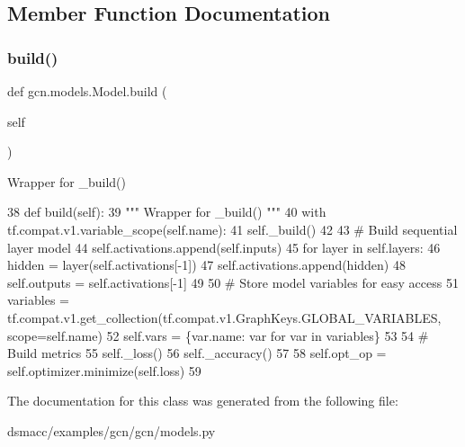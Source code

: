 \subsection{Member Function Documentation}
\mbox{\label{classgcn_1_1models_1_1Model_aee837dd0068d34def4494f1c8176fd21}} 
\subsubsection{\texorpdfstring{build()}{build()}}
{\footnotesize\ttfamily def gcn.\+models.\+Model.\+build (\begin{DoxyParamCaption}\item[{}]{self }\end{DoxyParamCaption})}

\begin{DoxyVerb}Wrapper for _build() \end{DoxyVerb}
 
\begin{DoxyCode}
38     \textcolor{keyword}{def }build(self):
39         \textcolor{stringliteral}{""" Wrapper for \_build() """}
40         with tf.compat.v1.variable\_scope(self.name):
41             self.\_build()
42 
43         \textcolor{comment}{# Build sequential layer model}
44         self.activations.append(self.inputs)
45         \textcolor{keywordflow}{for} layer \textcolor{keywordflow}{in} self.layers:
46             hidden = layer(self.activations[-1])
47             self.activations.append(hidden)
48         self.outputs = self.activations[-1]
49 
50         \textcolor{comment}{# Store model variables for easy access}
51         variables = tf.compat.v1.get\_collection(tf.compat.v1.GraphKeys.GLOBAL\_VARIABLES, scope=self.name)
52         self.vars = \{var.name: var \textcolor{keywordflow}{for} var \textcolor{keywordflow}{in} variables\}
53 
54         \textcolor{comment}{# Build metrics}
55         self.\_loss()
56         self.\_accuracy()
57 
58         self.opt\_op = self.optimizer.minimize(self.loss)
59 
\end{DoxyCode}


The documentation for this class was generated from the following file\+:\begin{DoxyCompactItemize}
\item 
dsmacc/examples/gcn/gcn/models.\+py\end{DoxyCompactItemize}
